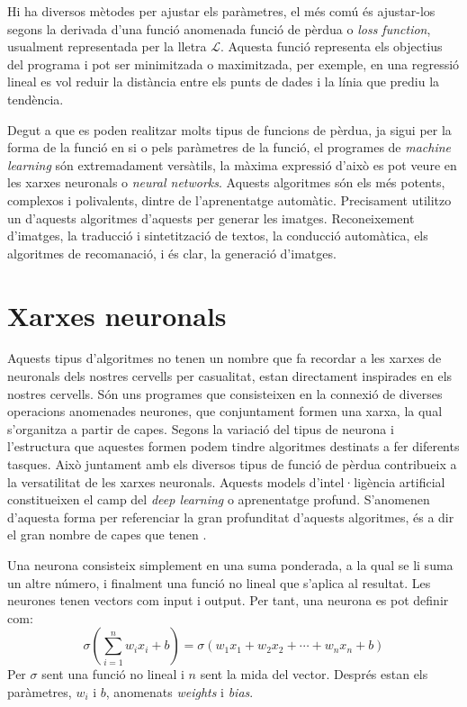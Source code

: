 Hi ha diversos mètodes per ajustar els paràmetres, el més comú és ajustar-los segons la derivada d'una funció anomenada funció de pèrdua o \textit{loss function}, usualment representada per la lletra $\mathcal{L}$. Aquesta funció representa els objectius del programa i pot ser minimitzada o maximitzada, per exemple, en una regressió lineal es vol reduir la distància entre els punts de dades i la línia que prediu la tendència.

Degut a que es poden realitzar molts tipus de funcions de pèrdua, ja sigui per la forma de la funció en si o pels paràmetres de la funció, el programes de \textit{machine learning} són extremadament versàtils, la màxima expressió d'això es pot veure en les xarxes neuronals o \textit{neural networks}. Aquests algoritmes són els més potents, complexos i polivalents, dintre de l'aprenentatge automàtic. Precisament utilitzo un d'aquests algoritmes d'aquests per generar les imatges. Reconeixement d'imatges, la traducció i sintetització de textos, la conducció automàtica, els algoritmes de recomanació, i és clar, la generació d'imatges.

\section{Xarxes neuronals}
Aquests tipus d'algoritmes no tenen un nombre que fa recordar a les xarxes de neuronals dels nostres cervells per casualitat, estan directament inspirades en els nostres cervells. Són uns programes que consisteixen en la connexió de diverses operacions anomenades neurones, que conjuntament formen una xarxa, la qual s'organitza a partir de capes. Segons la variació del tipus de neurona i l'estructura que aquestes formen podem tindre algoritmes destinats a fer diferents tasques. Això juntament amb els diversos tipus de funció de pèrdua contribueix a la versatilitat de les xarxes neuronals. Aquests models d'intel·ligència artificial constitueixen el camp del \textit{deep learning} o aprenentatge profund. S'anomenen d'aquesta forma per referenciar la gran profunditat d'aquests algoritmes, és a dir el gran nombre de capes que tenen \cite{DL:feedforward}.

Una neurona consisteix simplement en una suma ponderada, a la qual se li suma un altre número, i finalment una funció no lineal que s'aplica al resultat. Les neurones tenen vectors com input i output. Per tant, una neurona es pot definir com:
$$
\sigma \left(\sum_{i=1}^n w_i x_i + b\right) = \sigma \left( w_1x_1 + w_2x_2 + \cdots + w_nx_n + b 
\right) 
$$
Per $\sigma$ sent una funció no lineal i $n$ sent la mida del vector. Després estan els paràmetres, $w_i$ i $b$, anomenats \textit{weights} i \textit{bias}.

